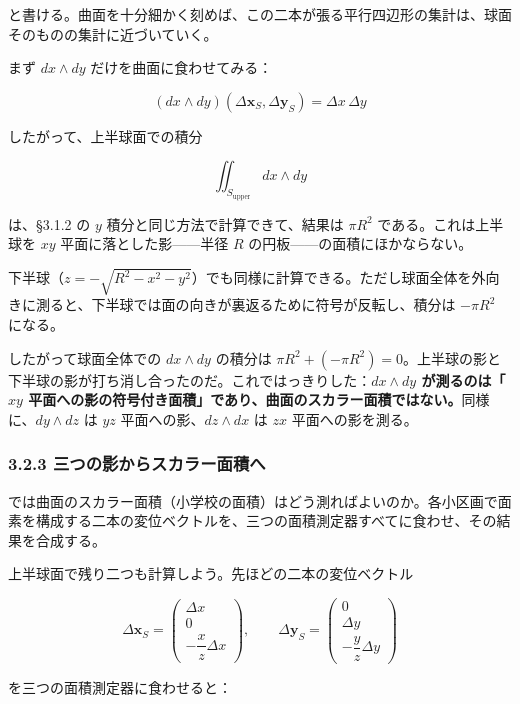 \documentclass[a4paper,12pt,openany]{book}
\begin{document}
と書ける。曲面を十分細かく刻めば、この二本が張る平行四辺形の集計は、球面そのものの集計に近づいていく。

まず \(dx \wedge dy\) だけを曲面に食わせてみる：

\[(dx \wedge dy)(\Delta\mathbf{x}_S,\Delta\mathbf{y}_S)=\Delta x\,\Delta y\]

したがって、上半球面での積分

\[
\iint_{S_{\text{upper}}} dx \wedge dy
\]

は、§3.1.2 の \(y\) 積分と同じ方法で計算できて、結果は \(\pi R^2\)
である。これは上半球を \(xy\) 平面に落とした影——半径 \(R\)
の円板——の面積にほかならない。

下半球（\(z = -\sqrt{R^2 - x^2 - y^2}\)）でも同様に計算できる。ただし球面全体を外向きに測ると、下半球では面の向きが裏返るために符号が反転し、積分は
\(-\pi R^2\) になる。

したがって球面全体での \(dx \wedge dy\) の積分は
\(\pi R^2 + (-\pi R^2) = 0\)。上半球の影と下半球の影が打ち消し合ったのだ。これではっきりした：\textbf{$dx \wedge dy$ が測るのは「$xy$ 平面への影の符号付き面積」であり、曲面のスカラー面積ではない。}同様に、\(dy \wedge dz\)
は \(yz\) 平面への影、\(dz \wedge dx\) は \(zx\) 平面への影を測る。

\hypertarget{ux4e09ux3064ux306eux5f71ux304bux3089ux30b9ux30abux30e9ux30fcux9762ux7a4dux3078}{%
\subsubsection{3.2.3
三つの影からスカラー面積へ}\label{ux4e09ux3064ux306eux5f71ux304bux3089ux30b9ux30abux30e9ux30fcux9762ux7a4dux3078}}

では曲面のスカラー面積（小学校の面積）はどう測ればよいのか。各小区画で面素を構成する二本の変位ベクトルを、三つの面積測定器すべてに食わせ、その結果を合成する。

上半球面で残り二つも計算しよう。先ほどの二本の変位ベクトル

\[\Delta\mathbf{x}_S=\begin{pmatrix}\Delta x\\0\\-\dfrac{x}{z}\Delta x\end{pmatrix},\qquad
\Delta\mathbf{y}_S=\begin{pmatrix}0\\\Delta y\\-\dfrac{y}{z}\Delta y\end{pmatrix}\]

を三つの面積測定器に食わせると：
\end{document}
